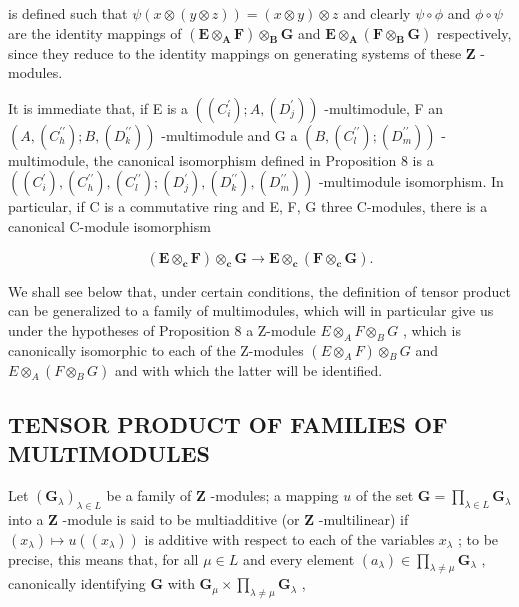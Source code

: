 is defined such that \(\psi(x \otimes (y \otimes z)) = (x \otimes y) \otimes z\) and clearly \(\psi \circ \phi\) and \(\phi \circ \psi\) are the identity mappings of \((\mathbf{E} \otimes_{\mathbf{A}} \mathbf{F}) \otimes_{\mathbf{B}} \mathbf{G}\) and \(\mathbf{E} \otimes_{\mathbf{A}} (\mathbf{F} \otimes_{\mathbf{B}} \mathbf{G})\) respectively, since they reduce to the identity mappings on generating systems of these \(\mathbf{Z}\) -modules.

It is immediate that, if E is a \(((C_{i}^{\prime}); A, (D_{j}^{\prime}))\) -multimodule, F an \((A, (C_{h}^{\prime\prime}); B, (D_{k}^{\prime\prime}))\) -multimodule and G a \((B, (C_{l}^{\prime\prime}); (D_{m}^{\prime\prime}))\) -multimodule, the canonical isomorphism defined in Proposition 8 is a \(((C_{i}^{\prime}), (C_{h}^{\prime\prime}), (C_{l}^{\prime\prime}); (D_{j}^{\prime}), (D_{k}^{\prime\prime}), (D_{m}^{\prime\prime}))\) -multimodule isomorphism. In particular, if C is a commutative ring and E, F, G three C-modules, there is a canonical C-module isomorphism

\[
(\mathbf {E} \otimes_ {\mathbf {c}} \mathbf {F}) \otimes_ {\mathbf {c}} \mathbf {G} \rightarrow \mathbf {E} \otimes_ {\mathbf {c}} (\mathbf {F} \otimes_ {\mathbf {c}} \mathbf {G}).
\]

We shall see below that, under certain conditions, the definition of tensor product can be generalized to a family of multimodules, which will in particular give us under the hypotheses of Proposition 8 a Z-module \(E \otimes_{A} F \otimes_{B} G\) , which is canonically isomorphic to each of the Z-modules \((E \otimes_{A} F) \otimes_{B} G\) and \(E \otimes_{A} (F \otimes_{B} G)\) and with which the latter will be identified.

\subsection{TENSOR PRODUCT OF FAMILIES OF MULTIMODULES}

Let \((\mathbf{G}_{\lambda})_{\lambda \in L}\) be a family of \(\mathbf{Z}\) -modules; a mapping \(u\) of the set \(\mathbf{G} = \prod_{\lambda \in L} \mathbf{G}_{\lambda}\) into a \(\mathbf{Z}\) -module is said to be multiadditive (or \(\mathbf{Z}\) -multilinear) if \((x_{\lambda}) \mapsto u((x_{\lambda}))\) is additive with respect to each of the variables \(x_{\lambda}\) ; to be precise, this means that, for all \(\mu \in L\) and every element \((a_{\lambda}) \in \prod_{\lambda \neq \mu} \mathbf{G}_{\lambda}\) , canonically identifying \(\mathbf{G}\) with \(\mathbf{G}_{\mu} \times \prod_{\lambda \neq \mu} \mathbf{G}_{\lambda}\) ,

